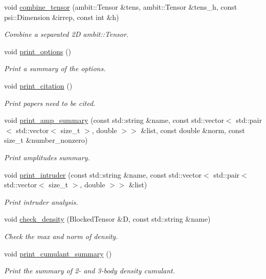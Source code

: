 \begin{DoxyCompactItemize}
void \mbox{\hyperlink{classforte_1_1_d_s_r_g___m_r_p_t_acdd93b6514696a2b08b25f4825a24a30}{combine\+\_\+tensor}} (ambit\+::\+Tensor \&tens, ambit\+::\+Tensor \&tens\+\_\+h, const psi\+::\+Dimension \&irrep, const int \&h)
\begin{DoxyCompactList}\small\item\em Combine a separated 2D ambit\+::\+Tensor. \end{DoxyCompactList}\item 
void \mbox{\hyperlink{classforte_1_1_d_s_r_g___m_r_p_t_afd5708ef5c74be6e82cd3701b4f4e968}{print\+\_\+options}} ()
\begin{DoxyCompactList}\small\item\em Print a summary of the options. \end{DoxyCompactList}\item 
void \mbox{\hyperlink{classforte_1_1_d_s_r_g___m_r_p_t_ae6dcf7ee77828815c86b6ce8b19b3266}{print\+\_\+citation}} ()
\begin{DoxyCompactList}\small\item\em Print papers need to be cited. \end{DoxyCompactList}\item 
void \mbox{\hyperlink{classforte_1_1_d_s_r_g___m_r_p_t_ab4fcb92ef63bc2d558f3ce354458f20c}{print\+\_\+amp\+\_\+summary}} (const std\+::string \&name, const std\+::vector$<$ std\+::pair$<$ std\+::vector$<$ size\+\_\+t $>$, double $>$$>$ \&list, const double \&norm, const size\+\_\+t \&number\+\_\+nonzero)
\begin{DoxyCompactList}\small\item\em Print amplitudes summary. \end{DoxyCompactList}\item 
void \mbox{\hyperlink{classforte_1_1_d_s_r_g___m_r_p_t_a4f00bb9e58057515a5800379d69495da}{print\+\_\+intruder}} (const std\+::string \&name, const std\+::vector$<$ std\+::pair$<$ std\+::vector$<$ size\+\_\+t $>$, double $>$$>$ \&list)
\begin{DoxyCompactList}\small\item\em Print intruder analysis. \end{DoxyCompactList}\item 
void \mbox{\hyperlink{classforte_1_1_d_s_r_g___m_r_p_t_a9e6940d281d6bfc34db888aef335bb0a}{check\+\_\+density}} (Blocked\+Tensor \&D, const std\+::string \&name)
\begin{DoxyCompactList}\small\item\em Check the max and norm of density. \end{DoxyCompactList}\item 
void \mbox{\hyperlink{classforte_1_1_d_s_r_g___m_r_p_t_a0f8881e67c904a590e9c74a5c65fbfbf}{print\+\_\+cumulant\+\_\+summary}} ()
\begin{DoxyCompactList}\small\item\em Print the summary of 2-\/ and 3-\/body density cumulant. \end{DoxyCompactList}\end{DoxyCompactItemize}
